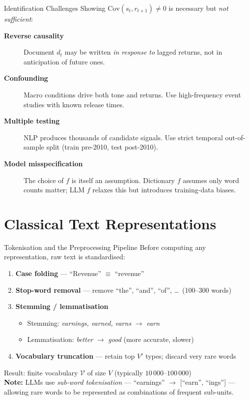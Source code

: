 \documentclass[9pt,t]{beamer}
\begin{document}
\begin{frame}{Identification Challenges}
  Showing $\mathrm{Cov}(s_t, r_{t+1}) \neq 0$ is necessary but \emph{not sufficient}:
  \medskip
  \begin{description}
    \item[\textbf{Reverse causality}]
      Document $d_t$ may be written \emph{in response to} lagged returns,
      not in anticipation of future ones.
    \item[\textbf{Confounding}]
      Macro conditions drive both tone and returns.
      Use high-frequency event studies with known release times.
    \item[\textbf{Multiple testing}]
      NLP produces thousands of candidate signals.
      Use strict temporal out-of-sample split (train pre-2010, test post-2010).
    \item[\textbf{Model misspecification}]
      The choice of $f$ is itself an assumption.
      Dictionary $f$ assumes only word counts matter;
      LLM $f$ relaxes this but introduces training-data biases.
  \end{description}
\end{frame}

\section{Classical Text Representations}

\begin{frame}{Tokenisation and the Preprocessing Pipeline}
  Before computing any representation, raw text is standardised:
  \begin{enumerate}
    \item \textbf{Case folding} --- ``Revenue'' $\equiv$ ``revenue''
    \item \textbf{Stop-word removal} --- remove ``the'', ``and'', ``of'', \ldots\ (100--300 words)
    \item \textbf{Stemming / lemmatisation}
          \begin{itemize}
            \item Stemming: \textit{earnings, earned, earns} $\to$ \textit{earn}
            \item Lemmatisation: \textit{better} $\to$ \textit{good} (more accurate, slower)
          \end{itemize}
    \item \textbf{Vocabulary truncation} --- retain top $V'$ types; discard very rare words
  \end{enumerate}
  \medskip
  Result: finite vocabulary $\mathcal{V}$ of size $V$ (typically $10\,000$--$100\,000$)\\[4pt]
  \textbf{Note:} LLMs use \emph{sub-word tokenisation} --- ``earnings'' $\to$ [``earn'', ``ings''] ---
  allowing rare words to be represented as combinations of frequent sub-units.
\end{frame}
\end{document}

